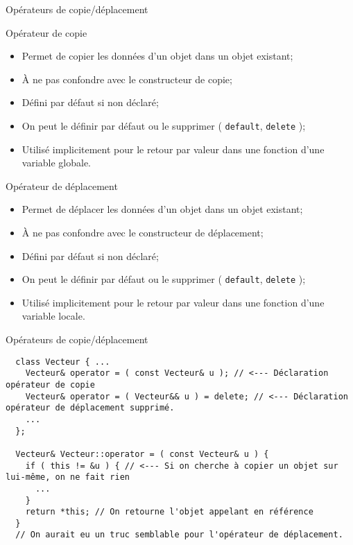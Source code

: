 \documentclass[compress,10pt,aspectratio=169]{beamer}
\begin{document}
  \begin{frame}{Opérateurs de copie/déplacement}
  \scriptsize
  \begin{block}{\small Opérateur de copie}
  \begin{itemize}
    \item Permet de copier les données d'un objet dans un objet existant;
    \item \`A ne pas confondre avec le constructeur de copie;
    \item Défini par défaut si non déclaré;
    \item On peut le définir par défaut ou le supprimer ( \texttt{default}, \texttt{delete} );
    \item Utilisé implicitement pour le retour par valeur dans une fonction d'une variable globale.
  \end{itemize}
  \end{block}
    
  \begin{block}{\small Opérateur de déplacement}
  \begin{itemize}
    \item Permet de déplacer les données d'un objet dans un objet existant;
    \item \`A ne pas confondre avec le constructeur de déplacement;
    \item Défini par défaut si non déclaré;
    \item On peut le définir par défaut ou le supprimer ( \texttt{default}, \texttt{delete} );
    \item Utilisé implicitement pour le retour par valeur dans une fonction d'une variable locale.
    \end{itemize}
  \end{block}
  \end{frame}
  
  \begin{frame}[fragile]{Opérateurs de copie/déplacement}
  \scriptsize
  \begin{verbatim}
  class Vecteur { ...
    Vecteur& operator = ( const Vecteur& u ); // <--- Déclaration opérateur de copie
    Vecteur& operator = ( Vecteur&& u ) = delete; // <--- Déclaration opérateur de déplacement supprimé.
    ...
  };
     
  Vecteur& Vecteur::operator = ( const Vecteur& u ) {
    if ( this != &u ) { // <--- Si on cherche à copier un objet sur lui-même, on ne fait rien
      ...
    }
    return *this; // On retourne l'objet appelant en référence
  }
  // On aurait eu un truc semblable pour l'opérateur de déplacement.
  \end{verbatim}
  \end{frame}
    
\end{document}
